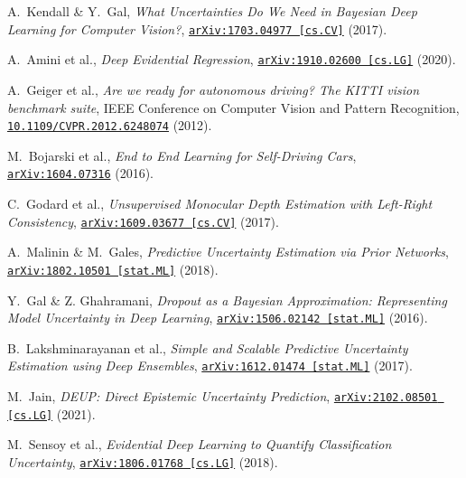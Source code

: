 \documentclass{article}
\begin{document}
\newpage
\begin{thebibliography}{11}
    A.~Kendall \& Y.~Gal,
    \textit{What Uncertainties Do We Need in Bayesian Deep Learning for Computer Vision?},
    \href{https://arxiv.org/abs/1703.04977}{\texttt{arXiv:1703.04977 [cs.CV]}} (2017).

    A.~Amini et al.,
    \textit{Deep Evidential Regression},
    \href{https://arxiv.org/abs/1910.02600}{\texttt{arXiv:1910.02600 [cs.LG]}} (2020).

    A.~Geiger et al.,
    \textit{Are we ready for autonomous driving? The KITTI vision benchmark suite}, IEEE Conference on Computer Vision and Pattern Recognition,
    \href{https://doi.org/10.1109/CVPR.2012.6248074}{\texttt{10.1109/CVPR.2012.6248074}} (2012).

    M.~Bojarski et al.,
    \textit{End to End Learning for Self-Driving Cars},
    \href{https://arxiv.org/abs/1604.07316}{\texttt{arXiv:1604.07316}} (2016).

    C.~Godard et al.,
    \textit{Unsupervised Monocular Depth Estimation with Left-Right Consistency},
    \href{https://arxiv.org/abs/1609.03677}{\texttt{arXiv:1609.03677 [cs.CV]}} (2017).

    A.~Malinin \& M.~Gales,
    \textit{Predictive Uncertainty Estimation via Prior Networks},
    \href{https://arxiv.org/abs/1802.10501}{\texttt{arXiv:1802.10501 [stat.ML]}} (2018).

    Y.~Gal \& Z. Ghahramani,
    \textit{Dropout as a Bayesian Approximation: Representing Model Uncertainty in Deep Learning},
    \href{https://arxiv.org/abs/1506.02142}{\texttt{arXiv:1506.02142 [stat.ML]}} (2016).

    B.~Lakshminarayanan et al.,
    \textit{Simple and Scalable Predictive Uncertainty Estimation using Deep Ensembles},
    \href{https://arxiv.org/abs/1612.01474}{\texttt{arXiv:1612.01474 [stat.ML]}} (2017).

    M.~Jain,
    \textit{DEUP: Direct Epistemic Uncertainty Prediction},
    \href{https://arxiv.org/abs/2102.08501}{\texttt{arXiv:2102.08501 [cs.LG]}} (2021).

    M.~Sensoy et al.,
    \textit{Evidential Deep Learning to Quantify Classification Uncertainty},
    \href{https://arxiv.org/abs/1806.01768}{\texttt{arXiv:1806.01768 [cs.LG]}} (2018).


\end{thebibliography}
\end{document}
